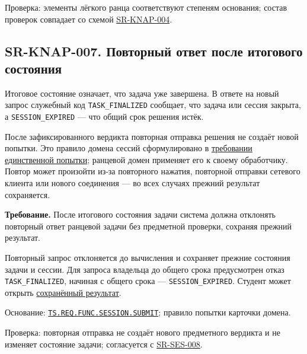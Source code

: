 \documentclass[12pt,a4paper]{article}
\begin{document}
Проверка: элементы лёгкого ранца соответствуют степеням основания; состав проверок совпадает со схемой {\hyperlink{sr-knap-004}{SR-KNAP-004}}.

\subsection{SR-KNAP-007. Повторный ответ после итогового состояния}\label{sr-knap-007-ux43fux43eux432ux442ux43eux440ux43dux44bux439-ux43eux442ux432ux435ux442-ux43fux43eux441ux43bux435-ux438ux442ux43eux433ux43eux432ux43eux433ux43e-ux441ux43eux441ux442ux43eux44fux43dux438ux44f}

\hypertarget{sr-knap-007-повторный-ответ-после-итогового-состояния}{}

\hypertarget{sr-knap-007}{}

Итоговое состояние означает, что задача уже завершена. В ответе на новый запрос служебный код \texttt{TASK\_\allowbreak{}FINALIZED} сообщает, что задача или сессия закрыта, а \texttt{SESSION\_\allowbreak{}EXPIRED} --- что общий срок решения истёк.

После зафиксированного вердикта повторная отправка решения не создаёт новой попытки. Это правило домена сессий сформулировано в {\hyperlink{sr-ses-008-одна-предметная-попытка}{требовании единственной попытки}}; ранцевой домен применяет его к своему обработчику. Повтор может произойти из-за повторного нажатия, повторной отправки сетевого клиента или нового соединения --- во всех случаях прежний результат сохраняется.

\textbf{Требование.} После итогового состояния задачи система должна отклонять повторный ответ ранцевой задачи без предметной проверки, сохраняя прежний результат.

Повторный запрос отклоняется до вычисления и сохраняет прежние состояния задачи и сессии. Для запроса владельца до общего срока предусмотрен отказ \texttt{TASK\_\allowbreak{}FINALIZED}, начиная с общего срока --- \texttt{SESSION\_\allowbreak{}EXPIRED}. Студент может открыть {\hyperlink{sr-ses-014-получение-сохранённого-результата}{сохранённый результат}}.

Основание: {\href{../02\_Техническое\_задание/DOC-02\_Техническое\_задание.pdf\#ts-req-func-session-submit}{\texttt{TS.\allowbreak{}REQ.\allowbreak{}FUNC.\allowbreak{}SESSION.\allowbreak{}SUBMIT}}}; правило попытки карточки домена.

Проверка: повторная отправка не создаёт нового предметного вердикта и не изменяет состояние задачи; согласуется с {\hyperlink{sr-ses-008}{SR-SES-008}}.
\end{document}
